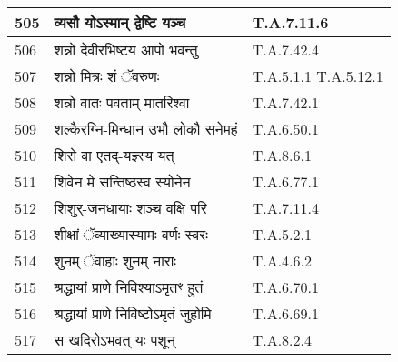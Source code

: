 \documentclass[17pt]{extarticle}
\begin{document}
\begin{longtable}{||p{0.4in}||p{4.9in}||p{0.9in}||}
    505 & व्यसौ योऽस्मान् द्वेष्टि यञ्च & T.A.7.11.6       \\
    
    \hline
        
    506 & शन्नो देवीरभिष्टय आपो भवन्तु & T.A.7.42.4       \\
    
    \hline
        
    507 & शन्नो मित्रः शं ॅवरुणः & T.A.5.1.1 T.A.5.12.1       \\
    
    \hline
        
    508 & शन्नो वातः पवताम् मातरिश्वा & T.A.7.42.1       \\
    
    \hline
        
    509 & शल्कैरग्नि{-}मिन्धान उभौ लोकौ सनेमहं & T.A.6.50.1       \\
    
    \hline
        
    510 & शिरो वा एतद्{-}यज्ञ्स्य यत् & T.A.8.6.1       \\
    
    \hline
        
    511 & शिवेन मे सन्तिष्ठस्व स्योनेन & T.A.6.77.1       \\
    
    \hline
        
    512 & शिशुर्{-}जनधायाः शञ्च वक्षि परि & T.A.7.11.4       \\
    
    \hline
        
    513 & शीक्षां ॅव्याख्यास्यामः वर्णः स्वरः & T.A.5.2.1       \\
    
    \hline
        
    514 & शुनम् ॅवाहाः शुनम् नाराः & T.A.4.6.2       \\
    
    \hline
        
    515 & श्रद्धायां प्राणे निविश्याऽमृतꣳ हुतं & T.A.6.70.1       \\
    
    \hline
        
    516 & श्रद्धायां प्राणे निविष्टोऽमृतं जुहोमि & T.A.6.69.1       \\
    
    \hline
        
    517 & स खदिरोऽभवत् यः पशून् & T.A.8.2.4       \\
    

\end{longtable}
\end{document}

